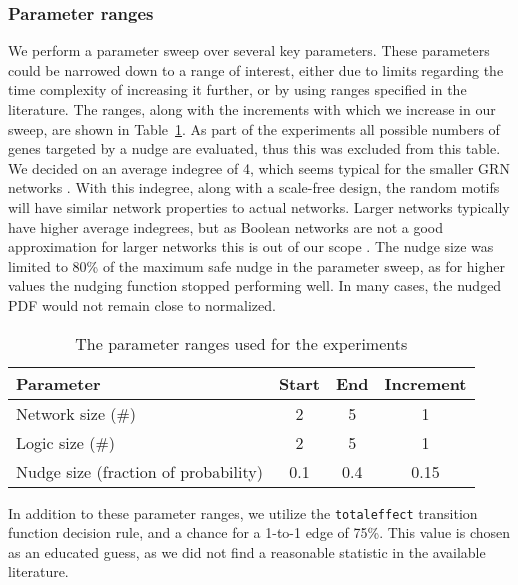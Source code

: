 \documentclass[../main.tex]{subfiles}
\begin{document}
\subsubsection{Parameter ranges}

We perform a parameter sweep over several key parameters.
These parameters could be narrowed down to a range of interest, either due to limits regarding the time complexity of increasing it further, or by using ranges specified in the literature.
The ranges, along with the increments with which we increase in our sweep, are shown in Table~\ref{parameters}.
As part of the experiments all possible numbers of genes targeted by a nudge are evaluated, thus this was excluded from this table.
We decided on an average indegree of 4, which seems typical for the smaller GRN networks \cite{lahdesmaki2003learning}.
With this indegree, along with a scale-free design, the random motifs will have similar network properties to actual networks.
Larger networks typically have higher average indegrees, but as Boolean networks are not a good approximation for larger networks this is out of our scope \cite{lahdesmaki2003learning, karlebach2008modelling}.
The nudge size was limited to 80\% of the maximum safe nudge in the parameter sweep, as for higher values the nudging function stopped performing well.
In many cases, the nudged PDF would not remain close to normalized.


\begin{table}
\begin{tabular}{| l | c | c | c |}
\hline
Parameter & Start & End & Increment \\
\hline
Network size (\#) & 2 & 5 & 1 \\
Logic size (\#) & 2 & 5 & 1 \\
Nudge size (fraction of probability) & 0.1 & 0.4 & 0.15 \\
\hline
\end{tabular}
\centering
\caption{The parameter ranges used for the experiments}
\label{parameters}
\end{table}

In addition to these parameter ranges, we utilize the \texttt{totaleffect} transition function decision rule, and a chance for a 1-to-1 edge of 75\%.
This value is chosen as an educated guess, as we did not find a reasonable statistic in the available literature.
\end{document}
